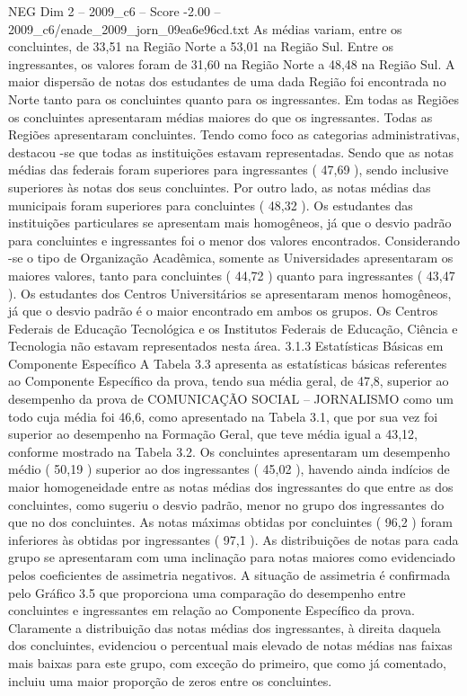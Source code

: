 \begin{textsample}{NEG Dim 2 – 2009\_c6 – Score -2.00 – 2009\_c6/enade\_2009\_jorn\_09ea6e96cd.txt}
As médias variam, entre os concluintes, de 33,51 na Região Norte a 53,01 na Região Sul.
Entre os ingressantes, os valores foram de 31,60 na Região Norte a 48,48 na Região Sul.
A maior dispersão de notas dos estudantes de uma dada Região foi encontrada no Norte tanto para os concluintes quanto para os ingressantes.
Em todas as Regiões os concluintes apresentaram médias maiores do que os ingressantes.
Todas as Regiões apresentaram concluintes.
Tendo como foco as categorias administrativas, destacou -se que todas as instituições estavam representadas.
Sendo que as notas médias das federais foram superiores para ingressantes ( 47,69 ), sendo inclusive superiores às notas dos seus concluintes.
Por outro lado, as notas médias das municipais foram superiores para concluintes ( 48,32 ).
Os estudantes das instituições particulares se apresentam mais homogêneos, já que o desvio padrão para concluintes e ingressantes foi o menor dos valores encontrados.
Considerando -se o tipo de Organização Acadêmica, somente as Universidades apresentaram os maiores valores, tanto para concluintes ( 44,72 ) quanto para ingressantes ( 43,47 ).
Os estudantes dos Centros Universitários se apresentaram menos homogêneos, já que o desvio padrão é o maior encontrado em ambos os grupos.
Os Centros Federais de Educação Tecnológica e os Institutos Federais de Educação, Ciência e Tecnologia não estavam representados nesta área. 3.1.3 Estatísticas Básicas em Componente Específico A Tabela 3.3 apresenta as estatísticas básicas referentes ao Componente Específico da prova, tendo sua média geral, de 47,8, superior ao desempenho da prova de COMUNICAÇÃO SOCIAL – JORNALISMO como um todo cuja média foi 46,6, como apresentado na Tabela 3.1, que por sua vez foi superior ao desempenho na Formação Geral, que teve média igual a 43,12, conforme mostrado na Tabela 3.2.
Os concluintes apresentaram um desempenho médio ( 50,19 ) superior ao dos ingressantes ( 45,02 ), havendo ainda indícios de maior homogeneidade entre as notas médias dos ingressantes do que entre as dos concluintes, como sugeriu o desvio padrão, menor no grupo dos ingressantes do que no dos concluintes.
As notas máximas obtidas por concluintes ( 96,2 ) foram inferiores às obtidas por ingressantes ( 97,1 ).
As distribuições de notas para cada grupo se apresentaram com uma inclinação para notas maiores como evidenciado pelos coeficientes de assimetria negativos.
A situação de assimetria é confirmada pelo Gráfico 3.5 que proporciona uma comparação do desempenho entre concluintes e ingressantes em relação ao Componente Específico da prova.
Claramente a distribuição das notas médias dos ingressantes, à direita daquela dos concluintes, evidenciou o percentual mais elevado de notas médias nas faixas mais baixas para este grupo, com exceção do primeiro, que como já comentado, incluiu uma maior proporção de zeros entre os concluintes.

\end{textsample}
